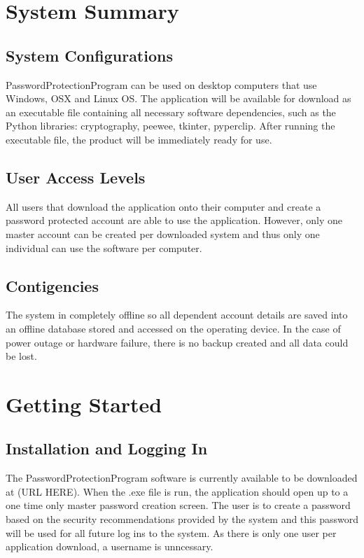 \documentclass[12pt, titlepage]{article}
\begin{document}
\section{System Summary} \label{SysSumm}


\subsection{System Configurations} \label{SysConf}

PasswordProtectionProgram can be used on desktop computers that use Windows, OSX and Linux OS. The application will be available for download as an executable file containing all necessary software dependencies, such as the Python libraries: cryptography, peewee, tkinter, pyperclip. After running the executable file, the product will be immediately ready for use.


\subsection{User Access Levels} \label{UserAcc}

All users that download the application onto their computer and create a password protected account are able to use the application. However, only one master account can be created per downloaded system and thus only one individual can use the software per computer.


\subsection{Contigencies} \label{Contigs}

The system in completely offline so all dependent account details are saved into an offline database stored and accessed on the operating device. In the case of power outage or hardware failure, there is no backup created and all data could be lost.


\section{Getting Started} \label{GetStart}

\subsection{Installation and Logging In} \label{install}

The PasswordProtectionProgram software is currently available to be downloaded at (URL HERE). When the .exe file is run, the application should open up to a one time only master password creation screen. The user is to create a password based on the security recommendations provided by the system and this password will be used for all future log ins to the system. As there is only one user per application download, a username is unncessary.
\end{document}
